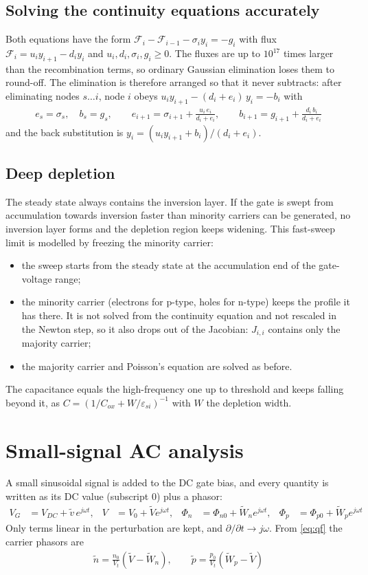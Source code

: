 \documentclass[11pt]{article}
\begin{document}
\subsection{Solving the continuity equations accurately}\label{sec:flux}
Both equations have the form
$\mathcal F_i-\mathcal F_{i-1}-\sigma_iy_i=-g_i$ with flux $\mathcal F_i=u_iy_{i+1}-d_iy_i$ and
$u_i,d_i,\sigma_i,g_i\ge0$. The fluxes are up to $10^{17}$ times larger than the recombination terms, so
ordinary Gaussian elimination loses them to round-off. The elimination is therefore arranged so that it
never subtracts: after eliminating nodes $s\dots i$, node $i$ obeys $u_iy_{i+1}-(d_i+e_i)\,y_i=-b_i$ with
\begin{align}
e_s=\sigma_s,\quad b_s=g_s,\qquad
e_{i+1}=\sigma_{i+1}+\frac{u_i\,e_i}{d_i+e_i},\qquad b_{i+1}=g_{i+1}+\frac{d_i\,b_i}{d_i+e_i}
\end{align}
and the back substitution is $y_i=\left(u_iy_{i+1}+b_i\right)/\left(d_i+e_i\right)$.

\subsection{Deep depletion}
The steady state always contains the inversion layer. If the gate is swept from accumulation
towards inversion faster than minority carriers can be generated, no inversion layer forms and the
depletion region keeps widening. This fast-sweep limit is modelled by freezing the minority carrier:
\begin{itemize}
\item the sweep starts from the steady state at the accumulation end of the gate-voltage range;
\item the minority carrier (electrons for p-type, holes for n-type) keeps the profile it has there. It is
not solved from the continuity equation and not rescaled in the Newton step, so it also drops out of the
Jacobian: $J_{i,i}$ contains only the majority carrier;
\item the majority carrier and Poisson's equation are solved as before.
\end{itemize}
The capacitance equals the high-frequency one up to threshold and keeps falling beyond it, as
$C=\left(1/C_{ox}+W/\varepsilon_{si}\right)^{-1}$ with $W$ the depletion width.

\section{Small-signal AC analysis}\label{sec:ac}
A small sinusoidal signal is added to the DC gate bias, and every quantity is written as its DC value
(subscript $0$) plus a phasor:
\begin{align}
V_G&=V_{DC}+\tilde v\,e^{j\omega t}, & V&=V_0+\tilde V e^{j\omega t}, &
\Phi_n&=\Phi_{n0}+\tilde W_n e^{j\omega t}, & \Phi_p&=\Phi_{p0}+\tilde W_p e^{j\omega t}
\end{align}
Only terms linear in the perturbation are kept, and $\partial/\partial t\to j\omega$. From \eqref{eq:qf}
the carrier phasors are
\begin{align}
\tilde n=\frac{n_0}{V_t}\left(\tilde V-\tilde W_n\right),\qquad
\tilde p=\frac{p_0}{V_t}\left(\tilde W_p-\tilde V\right)
\end{align}
\end{document}
